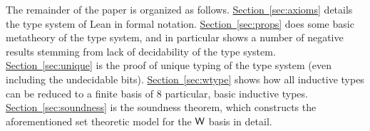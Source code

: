 The remainder of the paper is organized as follows. \hyperref[sec:axioms]{Section~\ref*{sec:axioms}} details the type system of Lean in formal notation. \hyperref[sec:props]{Section~\ref*{sec:props}} does some basic metatheory of the type system, and in particular shows a number of negative results stemming from lack of decidability of the type system. \hyperref[sec:unique]{Section~\ref*{sec:unique}} is the proof of unique typing of the type system (even including the undecidable bits). \hyperref[sec:wtype]{Section~\ref*{sec:wtype}} shows how all inductive types can be reduced to a finite basis of 8 particular, basic inductive types. \hyperref[sec:soundness]{Section~\ref*{sec:soundness}} is the soundness theorem, which constructs the aforementioned set theoretic model for the $\mathsf{W}$ basis in detail.
